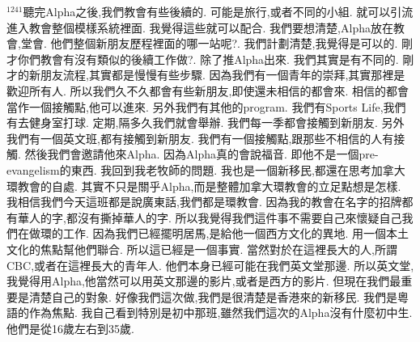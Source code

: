 \documentclass{book}
\begin{document}
$^{1241}$聽完Alpha之後,我們教會有些後續的.
可能是旅行,或者不同的小組.
就可以引流進入教會整個模樣系統裡面.
我覺得這些就可以配合.
我們要想清楚,Alpha放在教會,堂會.
他們整個新朋友歷程裡面的哪一站呢?.
我們計劃清楚,我覺得是可以的.
剛才你們教會有沒有類似的後續工作做?.
除了推Alpha出來.
我們其實是有不同的.
剛才的新朋友流程,其實都是慢慢有些步驟.
因為我們有一個青年的崇拜,其實那裡是歡迎所有人.
所以我們久不久都會有些新朋友,即使還未相信的都會來.
相信的都會當作一個接觸點,他可以進來.
另外我們有其他的program.
我們有Sports Life,我們有去健身室打球.
定期,隔多久我們就會舉辦.
我們每一季都會接觸到新朋友.
另外我們有一個英文班,都有接觸到新朋友.
我們有一個接觸點,跟那些不相信的人有接觸.
然後我們會邀請他來Alpha.
因為Alpha真的會說福音.
即他不是一個pre-evangelism的東西.
我回到我老牧師的問題.
我也是一個新移民,都還在思考加拿大環教會的自處.
其實不只是關乎Alpha,而是整體加拿大環教會的立足點想是怎樣.
我相信我們今天這班都是說廣東話,我們都是環教會.
因為我的教會在名字的招牌都有華人的字,都沒有撕掉華人的字.
所以我覺得我們這件事不需要自己來懷疑自己我們在做環的工作.
因為我們已經擺明居馬,是給他一個西方文化的異地.
用一個本土文化的焦點幫他們聯合.
所以這已經是一個事實.
當然對於在這裡長大的人,所謂CBC,或者在這裡長大的青年人.
他們本身已經可能在我們英文堂那邊.
所以英文堂,我覺得用Alpha,他當然可以用英文那邊的影片,或者是西方的影片.
但現在我們最重要是清楚自己的對象.
好像我們這次做,我們是很清楚是香港來的新移民.
我們是粵語的作為焦點.
我自己看到特別是初中那班,雖然我們這次的Alpha沒有什麼初中生.
他們是從16歲左右到35歲.
\end{document}
